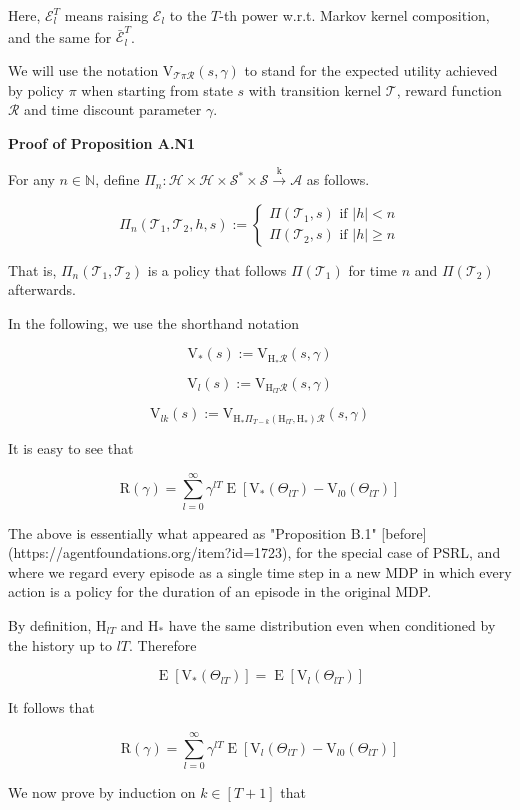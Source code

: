 \documentclass[a4paper]{article}
\newcommand{\Co}[1]{}
\newcommand{\AP}[1]{\left(#1\right)}
\newcommand{\AB}[1]{\left[#1\right]}
\newcommand{\Ea}[2]{\underset{#1}{\operatorname{E}}\AB{#2}}
\newcommand{\Nats}{\mathbb{N}}
\newcommand{\Abs}[1]{\left\vert #1 \right\vert}
\newcommand{\K}{\xrightarrow{\mathrm{k}}}
\newcommand{\St}{\mathcal{S}}
\newcommand{\A}{\mathcal{A}}
\newcommand{\R}{\mathcal{R}}
\newcommand{\T}{\mathcal{T}}
\newcommand{\Hy}{\mathcal{H}}
\newcommand{\V}{\mathrm{V}}
\newcommand{\Reg}{\mathrm{R}}
\newcommand{\SHy}{\mathrm{H}}
\newcommand{\Ev}{\mathcal{E}}
\begin{document}
Here, $\Ev_l^T$ means raising $\Ev_l$ to the $T$-th power w.r.t. Markov kernel composition, and the same for $\bar{\Ev}_l^T$.

We will use the notation $\V_{\T\pi\R}(s,\gamma)$ to stand for the expected utility achieved by policy $\pi$ when starting from state $s$ with transition kernel $\T$, reward function $\R$ and time discount parameter $\gamma$.

\textbf{Proof of Proposition A.N1}\Co{b}

For any $n\in\Nats$, define $\Pi_n:\Hy\times\Hy\times\St^*\times\St\K\A$ as follows.

$$\Pi_n\AP{\T_1,\T_2,h,s}:=\begin{cases} \Pi\AP{\T_1,s} \text{ if } \Abs{h}<n \\ \Pi\AP{\T_2,s} \text{ if }\Abs{h} \geq n \end{cases}$$

That is, $\Pi_n\AP{\T_1,\T_2}$ is a policy that follows $\Pi\AP{\T_1}$ for time $n$ and $\Pi\AP{\T_2}$ afterwards. 

In the following, we use the shorthand notation 

$$\V_*(s):=\V_{\SHy_*\R}(s,\gamma)$$

$$\V_l(s):=\V_{\SHy_{lT}\R}(s,\gamma)$$

$$\V_{lk}(s):=\V_{\SHy_{*}\Pi_{T-k}\AP{\SHy_{lT},\SHy_*}\R}\AP{s,\gamma}$$

It is easy to see that

$$\Reg(\gamma)=\sum_{l=0}^\infty{\gamma^{lT}\Ea{}{\V_{*}\AP{\Theta_{lT}}-\V_{l0}\AP{\Theta_{lT}}}}$$

The above is essentially what appeared as "Proposition B.1" [before](https://agentfoundations.org/item?id=1723), for the special case of PSRL, and where we regard every episode as a single time step in a new MDP in which every action is a policy for the duration of an episode in the original MDP.

By definition, $\SHy_{lT}$ and $\SHy_*$ have the same distribution even when conditioned by the history up to $lT$. Therefore

$$\Ea{}{\V_{*}\AP{\Theta_{lT}}}=\Ea{}{\V_{l}\AP{\Theta_{lT}}}$$

It follows that

$$\Reg(\gamma)=\sum_{l=0}^\infty{\gamma^{lT}\Ea{}{\V_{l}\AP{\Theta_{lT}}-\V_{l0}\AP{\Theta_{lT}}}}$$

We now prove by induction on $k\in[T+1]$ that
\end{document}
